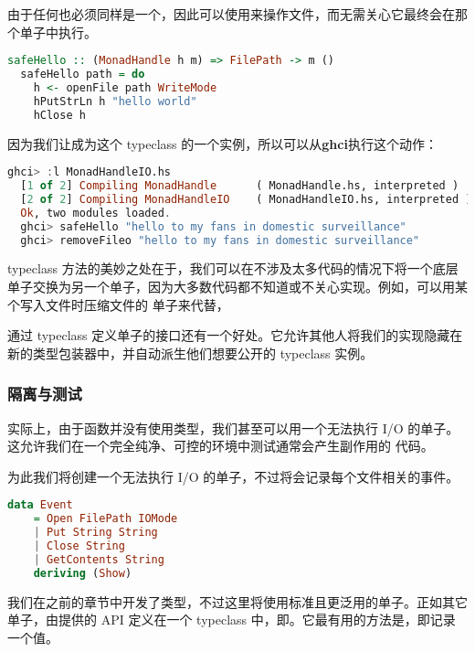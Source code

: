 \documentclass[./main.tex]{subfiles}
\begin{document}
由于任何也必须同样是一个，因此可以使用来操作文件，而无需关心它最终会在那个单子中执行。

\begin{lstlisting}[language=Haskell]
  safeHello :: (MonadHandle h m) => FilePath -> m ()
  safeHello path = do
    h <- openFile path WriteMode
    hPutStrLn h "hello world"
    hClose h
\end{lstlisting}

因为我们让成为这个 typeclass 的一个实例，所以可以从\textbf{ghci}执行这个动作：

\begin{lstlisting}[language=Haskell]
  ghci> :l MonadHandleIO.hs
  [1 of 2] Compiling MonadHandle      ( MonadHandle.hs, interpreted )
  [2 of 2] Compiling MonadHandleIO    ( MonadHandleIO.hs, interpreted )
  Ok, two modules loaded.
  ghci> safeHello "hello to my fans in domestic surveillance"
  ghci> removeFileo "hello to my fans in domestic surveillance"
\end{lstlisting}

typeclass 方法的美妙之处在于，我们可以在不涉及太多代码的情况下将一个底层单子交换为另一个单子，因为大多数代码都不知道或不关心实现。例如，可以用某个写入文件时压缩文件的
单子来代替，

通过 typeclass 定义单子的接口还有一个好处。它允许其他人将我们的实现隐藏在新的类型包装器中，并自动派生他们想要公开的 typeclass 实例。

\subsubsection*{隔离与测试}

实际上，由于函数并没有使用类型，我们甚至可以用一个无法执行 I/O 的单子。这允许我们在一个完全纯净、可控的环境中测试通常会产生副作用的
代码。

为此我们将创建一个无法执行 I/O 的单子，不过将会记录每个文件相关的事件。

\begin{lstlisting}[language=Haskell]
  data Event
    = Open FilePath IOMode
    | Put String String
    | Close String
    | GetContents String
    deriving (Show)
\end{lstlisting}

我们在之前的章节中开发了类型，不过这里将使用标准且更泛用的单子。正如其它单子，由提供的 API 定义在一个
typeclass 中，即。它最有用的方法是，即记录一个值。
\end{document}
